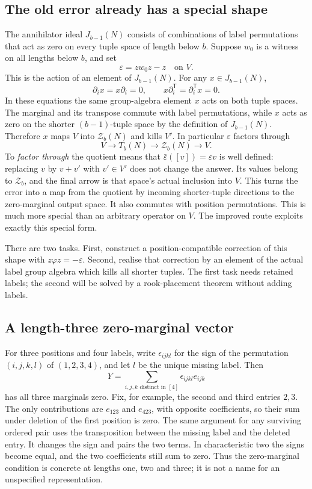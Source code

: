 \subsection{The old error already has a special shape}
The annihilator ideal $J_{b-1}(N)$ consists of combinations of label
permutations that act as zero on every tuple space of length below $b$.
Suppose $w_0$ is a witness on all lengths below $b$, and set
\[\varepsilon=zw_0z-z\quad\text{on }V.\]
This is the action of an element of $J_{b-1}(N)$. For any $x\in J_{b-1}(N)$,
\[\partial_i x=x\partial_i=0,\qquad x\partial_i^{\mathsf T}=\partial_i^{\mathsf T}x=0.
\]
In these equations the same group-algebra element $x$ acts on both
tuple spaces. The marginal and its transpose commute with label
permutations, while $x$ acts as zero on the shorter $(b-1)$-tuple
space by the definition of $J_{b-1}(N)$.
Therefore $x$ maps $V$ into $\mathcal Z_b(N)$ and kills $V'$. In particular $\varepsilon$ factors through
\[V\longrightarrow T_b(N)\longrightarrow \mathcal Z_b(N)\longrightarrow V.
\]
To \emph{factor through} the quotient means that
$\bar\varepsilon([v])=\varepsilon v$ is well defined: replacing $v$
by $v+v'$ with $v'\in V'$ does not change the answer. Its values
belong to $\mathcal Z_b$, and the final arrow is that space's actual
inclusion into $V$. This turns the error into a map from the quotient
by incoming shorter-tuple directions to the zero-marginal output space.
It also commutes with position permutations. This is much more special than an arbitrary operator on $V$. The improved route exploits exactly this special form.

There are two tasks. First, construct a position-compatible correction of this shape with $z\varphi z=-\varepsilon$. Second, realise that correction by an element of the actual label group algebra which kills all shorter tuples. The first task needs retained labels; the second will be solved by a rook-placement theorem without adding labels.

\subsection{A length-three zero-marginal vector}
For three positions and four labels, write
$\epsilon_{ijkl}$ for the sign of the permutation $(i,j,k,l)$
of $(1,2,3,4)$, and let $l$ be the unique missing label. Then
\[
           Y=\sum_{i,j,k\text{ distinct in }[4]}
                        \epsilon_{ijkl}e_{ijk}
\]
has all three marginals zero. Fix, for example, the second and third
entries $2,3$. The only contributions are $e_{123}$ and $e_{423}$,
with opposite coefficients, so their sum under deletion of the first
position is zero. The same argument for any surviving ordered pair
uses the transposition between the missing label and the deleted
entry. It changes the sign and pairs the two terms. In characteristic
two the signs become equal, and the two coefficients still sum to
zero. Thus the zero-marginal condition is concrete at lengths one,
two and three; it is not a name for an unspecified representation.

